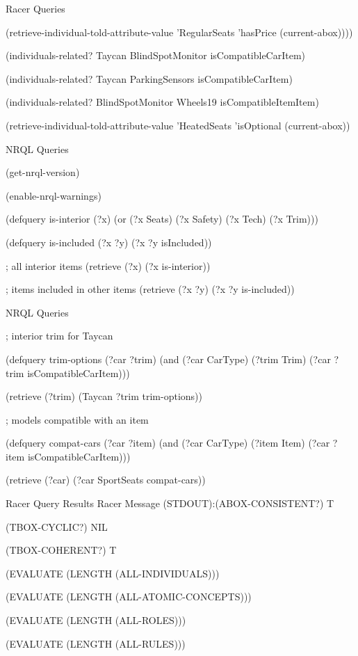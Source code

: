 \documentclass{beamer}
\begin{document}
\begin{frame}{Racer Queries}
    \begin{examples}
        
(retrieve-individual-told-attribute-value 'RegularSeats 'hasPrice (current-abox))))

(individuals-related? Taycan BlindSpotMonitor isCompatibleCarItem)

(individuals-related? Taycan ParkingSensors isCompatibleCarItem)

(individuals-related? BlindSpotMonitor Wheels19 isCompatibleItemItem)

(retrieve-individual-told-attribute-value 'HeatedSeats 'isOptional (current-abox))
    \end{examples}
\end{frame}

\begin{frame}{NRQL Queries}
\begin{examples}
(get-nrql-version)
    
(enable-nrql-warnings)

(defquery is-interior (?x) (or (?x Seats) (?x Safety) (?x Tech) (?x Trim)))

(defquery is-included (?x ?y) (?x ?y isIncluded))

; all interior items
(retrieve (?x) (?x is-interior))

; items included in other items
(retrieve (?x ?y) (?x ?y is-included))

\end{examples}
\end{frame}

\begin{frame}{NRQL Queries}
\begin{examples}
; interior trim for Taycan

(defquery trim-options (?car ?trim) (and (?car CarType) (?trim Trim) (?car ?trim isCompatibleCarItem)))

(retrieve (?trim) (Taycan ?trim trim-options))

; models compatible with an item

(defquery compat-cars (?car ?item) (and (?car CarType) (?item Item) (?car ?item isCompatibleCarItem)))

(retrieve (?car) (?car SportSeats compat-cars))
\end{examples}
\end{frame}

\begin{frame}{Racer Query Results}
    Racer Message (STDOUT):(ABOX-CONSISTENT?) \rightarrow T
    
(TBOX-CYCLIC?) \rightarrow NIL

(TBOX-COHERENT?) \rightarrow T

(EVALUATE (LENGTH (ALL-INDIVIDUALS))) 

(EVALUATE (LENGTH (ALL-ATOMIC-CONCEPTS))) 

(EVALUATE (LENGTH (ALL-ROLES))) 

(EVALUATE (LENGTH (ALL-RULES))) 
\end{frame}
\end{document}
